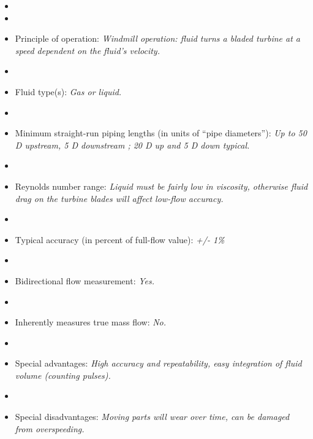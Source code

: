 \begin{itemize}
\goodbreak
\item{} 
\vskip 5pt
\item\item{} Principle of operation: {\it Windmill operation: fluid turns a bladed turbine at a speed dependent on the fluid's velocity.}
\vskip 5pt
\item\item{} Fluid type(s): {\it Gas or liquid.}
\vskip 5pt
\item\item{} Minimum straight-run piping lengths (in units of ``pipe diameters''): {\it Up to 50 D upstream, 5 D downstream ; 20 D up and 5 D down typical.}
\vskip 5pt
\item\item{} Reynolds number range: {\it Liquid must be fairly low in viscosity, otherwise fluid drag on the turbine blades will affect low-flow accuracy.}
\vskip 5pt
\item\item{} Typical accuracy (in percent of full-flow value): {\it +/- 1\%}
\vskip 5pt
\item\item{} Bidirectional flow measurement: {\it Yes.}
\vskip 5pt
\item\item{} Inherently measures true mass flow: {\it No.}
\vskip 5pt
\item\item{} Special advantages: {\it High accuracy and repeatability, easy integration of fluid volume (counting pulses).}
\vskip 5pt
\item\item{} Special disadvantages: {\it Moving parts will wear over time, can be damaged from overspeeding.}
\end{itemize}


